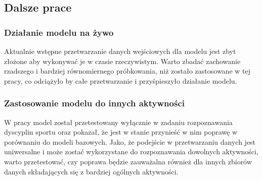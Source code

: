 \subsection{Dalsze prace}
\subsubsection{Działanie modelu na żywo}
Aktualnie wstępne przetwarzanie danych wejściowych dla modelu jest zbyt złożone aby wykonywać je w czasie rzeczywistym. Warto zbadać zachowanie rzadszego i bardziej równomiernego próbkowania, niż zostało zastosowane w tej pracy, co odciążyło by całe przetwarzanie i przyśpieszyło działanie modelu. 
\subsubsection{Zastosowanie modelu do innych aktywności}
W pracy model został przetestowany wyłącznie w zadaniu rozpoznawania dyscyplin sportu oraz pokazał, że jest w stanie przynieść w nim poprawę w porównaniu do modeli bazowych. Jako, że podejście w przetwarzaniu danych jest uniwersalne i może zostać wykorzystane do rozpoznawania dowolnych aktywności, warto przetestować, czy poprawa będzie zauważalna również dla innych zbiorów danych składających się z bardziej ogólnych aktywności. 